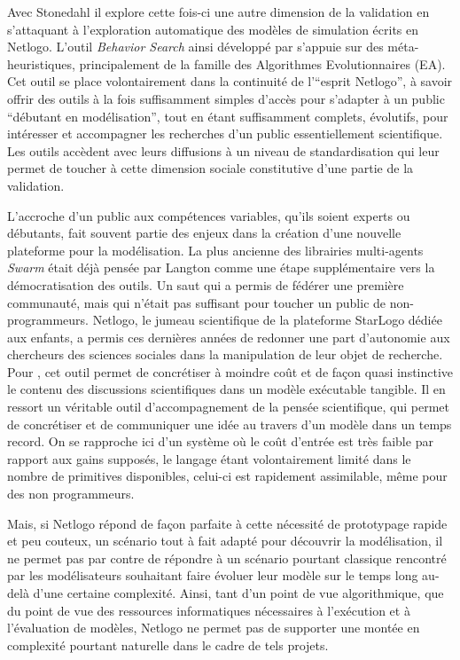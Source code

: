 Avec Stonedahl \autocites{Stonedahl2011, Stonedahl2011b, Stonedahl2010} il explore cette fois-ci une autre dimension de la validation en s'attaquant à l'exploration automatique des modèles de simulation écrits en Netlogo. L'outil \textit{Behavior Search} ainsi développé par \textcite{Stonedahl2011a} s'appuie sur des méta-heuristiques, principalement de la famille des Algorithmes Evolutionnaires (EA). Cet outil se place volontairement dans la continuité de l'\enquote{esprit Netlogo}, à savoir offrir des outils à la fois suffisamment simples d'accès pour s'adapter à un public \enquote{débutant en modélisation}, tout en étant suffisamment complets, évolutifs, pour intéresser et accompagner les recherches d'un public essentiellement scientifique. Les outils accèdent avec leurs diffusions à un niveau de standardisation qui leur permet de toucher à cette dimension sociale constitutive d'une partie de la validation.

L'accroche d'un public aux compétences variables, qu'ils soient experts ou débutants, fait souvent partie des enjeux dans la création d'une nouvelle plateforme pour la modélisation. La plus ancienne des librairies multi-agents \textit{Swarm} était déjà pensée par Langton comme une étape supplémentaire vers la démocratisation des outils. Un saut qui a permis de fédérer une première communauté, mais qui n'était pas suffisant pour toucher un public de non-programmeurs. Netlogo, le jumeau scientifique de la plateforme StarLogo dédiée aux enfants, a permis ces dernières années de redonner une part d'autonomie aux chercheurs des sciences sociales dans la manipulation de leur objet de recherche. Pour \textcite{Banos2013}, cet outil permet de concrétiser à moindre coût et de façon quasi instinctive le contenu des discussions scientifiques dans un modèle exécutable tangible. Il en ressort un véritable outil d'accompagnement de la pensée scientifique, qui permet de concrétiser et de communiquer une idée au travers d'un modèle dans un temps record. On se rapproche ici d'un système où le coût d'entrée est très faible par rapport aux gains supposés, le langage étant volontairement limité dans le nombre de primitives disponibles, celui-ci est rapidement assimilable, même pour des non programmeurs. 

Mais, si Netlogo répond de façon parfaite à cette nécessité de prototypage rapide et peu couteux, un scénario tout à fait adapté pour découvrir la modélisation, il ne permet pas par contre de répondre à un scénario pourtant classique rencontré par les modélisateurs souhaitant faire évoluer leur modèle sur le temps long au-delà d'une certaine complexité. Ainsi, tant d'un point de vue algorithmique, que du point de vue des ressources informatiques nécessaires à l'exécution et à l'évaluation de modèles, Netlogo ne permet pas de supporter une montée en complexité pourtant naturelle dans le cadre de tels projets. 

